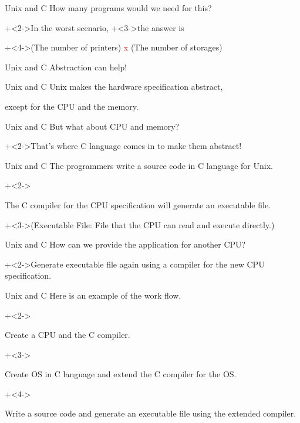 \begin{frame}{Unix and C}{}
    How many programs would we need for this?
    \vspace{4ex}

    \onslide+<2->{In the worst scenario,}
    \onslide+<3->{the answer is}
    \vspace{4ex}

    \onslide+<4->{{\small(The number of printers) \textcolor{red}{x} (The number of storages)}}
\end{frame}


\begin{frame}{Unix and C}{}
    Abstraction can help!
\end{frame}


\begin{frame}{Unix and C}{}
    Unix makes the hardware specification abstract,

    except for the CPU and the memory.
\end{frame}


\begin{frame}{Unix and C}{}
    But what about CPU and memory?
    \vspace{4ex}

    \onslide+<2->{That's where C language comes in to make them abstract!}
\end{frame}


\begin{frame}{Unix and C}{}
    The programmers write a source code in C language for Unix.
    \vspace{4ex}

    \onslide+<2->{The C compiler for the CPU specification will generate an executable file.
    \vspace{2ex}

    \onslide+<3->{(Executable File: File that the CPU can read and execute directly.)}}
\end{frame}


\begin{frame}{Unix and C}{}
    How can we provide the application for another CPU?
    \vspace{4ex}

    \onslide+<2->{Generate executable file again using a compiler for the new CPU specification.}
\end{frame}


\begin{frame}{Unix and C}{}
    Here is an example of the work flow.
    \vspace{4ex}

    \begin{enumerate}
        \onslide+<2->{\item Create a CPU and the C compiler.}
        \onslide+<3->{\item Create OS in C language and extend the C compiler for the OS.}
        \onslide+<4->{\item Write a source code and generate an executable file using the extended compiler.}
    \end{enumerate}
\end{frame}


